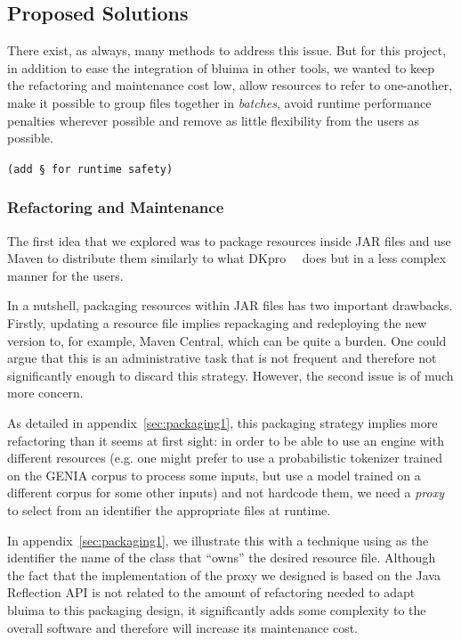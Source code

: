 \documentclass{article}
\newcommand{\JAR}{JAR\xspace}
\newcommand{\TODO}[1]{\texttt{\textcolor{YellowOrange}{(#1)}}} %
\begin{document}
\subsection{Proposed Solutions}

There exist, as always, many methods to address this issue. But for this project, in addition to
ease the integration of bluima in other tools, we wanted to keep the refactoring and maintenance
cost low, allow resources to refer to one-another, make it possible to group files together in
\emph{batches}, avoid runtime performance penalties wherever possible and remove as little
flexibility from the users as possible.

\TODO{add § for runtime safety}

\subsubsection{Refactoring and Maintenance}

The first idea that we explored was to package resources inside \JAR files and use Maven to
distribute them similarly to what DKpro~\cite{dkpro}~\cite{dkpro_2014} does but in a less complex
manner for the users.

In a nutshell, packaging resources within \JAR files has two important drawbacks. Firstly, updating
a resource file implies repackaging and redeploying the new version to, for example, Maven Central,
which can be quite a burden. One could argue that this is an administrative task that is not
frequent and therefore not significantly enough to discard this strategy. However, the second issue
is of much more concern.

As detailed in appendix~\ref{sec:packaging1}, this packaging strategy implies more refactoring than
it seems at first sight: in order to be able to use an engine with different resources (e.g. one
might prefer to use a probabilistic tokenizer trained on the GENIA corpus to process some inputs,
but use a model trained on a different corpus for some other inputs) and not hardcode them, we need
a \emph{proxy} to select from an identifier the appropriate files at runtime.

In appendix~\ref{sec:packaging1}, we illustrate this with a technique using as the identifier the
name of the class that ``owns'' the desired resource file. Although the fact that the implementation
of the proxy we designed is based on the Java Reflection API is not related to the amount of
refactoring needed to adapt bluima to this packaging design, it significantly adds some complexity
to the overall software and therefore will increase its maintenance cost.
\end{document}
